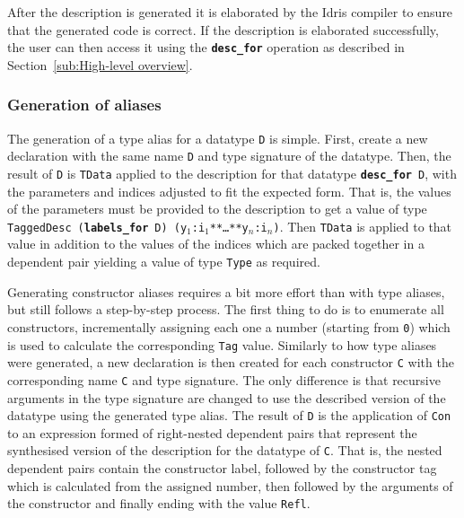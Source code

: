 \documentclass{ituthesis}
\newcommand{\ttconstructor}[1]{\textcolor{constructor-color}{\texttt{#1}}}
\newcommand{\tttype}[1]{\textcolor{type-color}{\texttt{#1}}}
\newcommand{\ttdec}[1]{\textcolor{declared-var-color}{\texttt{#1}}}
\newcommand{\ttvar}[1]{\textcolor{local-var-color}{\texttt{#1}}}
\newcommand{\ttliteral}[1]{\textcolor{literal-color}{\texttt{#1}}}
\theoremstyle{break}
\begin{document}
After the description is generated it is elaborated by the Idris compiler to ensure that the generated code is correct.
If the description is elaborated successfully, the user can then access it using the \texttt{\textbf{desc\_for}} operation as described in Section~\ref{sub:High-level overview}.

\subsubsection{Generation of aliases}
\label{ssub:Generation of aliases}
The generation of a type alias for a datatype \tttype{D} is simple.
First, create a new declaration with the same name \ttdec{D} and type signature of the datatype. 
Then, the result of \ttdec{D} is \ttdec{TData} applied to the description for that datatype \texttt{\textbf{desc\_for}}~\tttype{D}, with the parameters and indices adjusted to fit the expected form.
That is, the values of the parameters must be provided to the description to get a value of type \ttdec{TaggedDesc}~\texttt{(\textbf{labels\_for}}~\tttype{D}\texttt{)}~\tttype{(}\ttvar{y$_1$}\texttt{:}\ttvar{i$_1$}\tttype{**}\texttt{\ldots}\tttype{**}\ttvar{y$_n$}\texttt{:}\ttvar{i$_n$}\tttype{)}.
Then \ttdec{TData} is applied to that value in addition to the values of the indices which are packed together in a dependent pair yielding a value of type \tttype{Type} as required.

Generating constructor aliases requires a bit more effort than with type aliases, but still follows a step-by-step process.
The first thing to do is to enumerate all constructors, incrementally assigning each one a number (starting from \ttliteral{0}) which is used to calculate the corresponding \tttype{Tag} value.
Similarly to how type aliases were generated, a new declaration is then created for each constructor \ttconstructor{C} with the corresponding name \ttdec{C} and type signature.
The only difference is that recursive arguments in the type signature are changed to use the described version of the datatype using the generated type alias.
The result of \ttdec{D} is the application of \ttconstructor{Con} to an expression formed of right-nested dependent pairs that represent the synthesised version of the description for the datatype of \ttconstructor{C}.
That is, the nested dependent pairs contain the constructor label, followed by the constructor tag which is calculated from the assigned number, then followed by the arguments of the constructor
and finally ending with the value \ttconstructor{Refl}.
\end{document}
